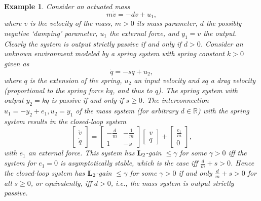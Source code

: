 \documentclass[11pt]{article}
\newtheorem{example}[lemma]{Example}
\newcommand{\Ltwo}{\boldsymbol{\rm L}_{2}}
\begin{document}
\begin{example}
Consider an actuated mass
\[
m\dot{v}  =  - dv + u_1, %
\]
where $v$ is the velocity of the mass, $m > 0$ its mass parameter, $d$ the possibly negative `damping' parameter, $u_1$ the external force, and $y_1=v$ the output. Clearly the system is output strictly passive if and only if $d > 0$. Consider an unknown environment modeled by a spring system with spring constant $k>0$ given as
\[
\dot{q}  =  - sq + u_2,  %
\]
where $q$ is the extension of the spring, $u_2$ an input velocity and $sq $ a drag velocity (proportional to the spring force $kq$, and thus to $q$). The spring system with output $y_2=kq$ is passive if and only if $s \geq 0$.
The interconnection $u_1=-y_2 +e_1, u_2=y_1$ of the mass system (for arbitrary $d \in \mathbb{R}$) with the spring system results in the closed-loop system
\[
\begin{bmatrix} \dot{v} \\ \dot{q} \end{bmatrix} = 
\begin{bmatrix} -\frac{d}{m} & -\frac{1}{m} \\ 1 & -s \end{bmatrix}
\begin{bmatrix} v \\ q \end{bmatrix} + \begin{bmatrix} \frac{e_1}{m} \\ 0 \end{bmatrix},
\]
with $e_1$ an external force. This system has $\Ltwo$-gain $\leq \gamma$ for some $\gamma >0$ iff the system for $e_1=0$ is
asymptotically stable, which is the case iff $\frac{d}{m} + s > 0$. Hence the closed-loop system has $\Ltwo$-gain $\leq \gamma$ for some
$\gamma >0$ if and only $\frac{d}{m} + s > 0$ for all $s\geq 0$, or equivalently, iff $d >0$, i.e., the mass system is output strictly passive.
%
\end{example}
\end{document}
